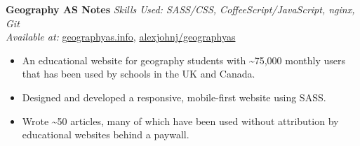 \textbf{Geography AS Notes}  \newline
\textit{Skills Used: SASS/CSS, CoffeeScript/JavaScript, nginx, Git}\\
\textit{Available at:} \href{https://geographyas.info}{geographyas.info}, \href{https://github.com/\myweb/geographyas}{alexjohnj/geographyas}
\begin{itemize}[leftmargin=0mm]
\item An educational website for geography students with \textasciitilde{}75,000
  monthly users that has been used by schools in the UK and Canada.
\item Designed and developed a responsive, mobile-first website using SASS.
\item Wrote \textasciitilde{}50 articles, many of which have been used without
  attribution by educational websites behind a paywall.
\end{itemize}

